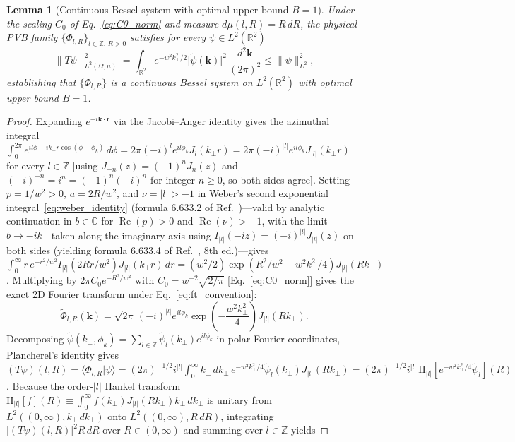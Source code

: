 \documentclass[aps,pra,reprint,nofootinbib,floatfix,longbibliography]{revtex4-2}
\newtheorem{lemma}{Lemma}
\theoremstyle{remark}
\newcommand{\braket}[2]{\langle #1 | #2 \rangle}
\newcommand{\norm}[1]{\lVert #1 \rVert}
\newcommand{\abs}[1]{\lvert #1 \rvert}
\begin{document}
\begin{lemma}[Continuous Bessel system with optimal upper bound $B=1$]
\label{lem:bessel_upper}
Under the scaling $C_0$ of Eq.~\eqref{eq:C0_norm} and measure \mbox{$d\mu(l,R) = R\,dR$}, the physical PVB family $\{\Phi_{l,R}\}_{l\in\mathbb{Z},\,R>0}$ satisfies for every $\psi \in L^2(\mathbb{R}^2)$
\begin{equation}
\norm{T\psi}_{L^2(\Omega,\mu)}^2 = \int_{\mathbb{R}^2} e^{-w^2 k_\perp^2/2}\abs{\widetilde{\psi}(\mathbf{k})}^2\,\frac{d^2\mathbf{k}}{(2\pi)^2} \le \norm{\psi}_{L^2}^2,
\label{eq:bessel_lemma}
\end{equation}
establishing that $\{\Phi_{l,R}\}$ is a continuous Bessel system on $L^2(\mathbb{R}^2)$ with optimal upper bound $B = 1$.
\end{lemma}
\begin{proof}
Expanding $e^{-i\mathbf{k}\cdot\mathbf{r}}$ via the Jacobi--Anger identity gives the azimuthal integral $\int_0^{2\pi} e^{il\phi - ik_\perp r\cos(\phi-\phi_k)}\,d\phi = 2\pi (-i)^l e^{il\phi_k} J_l(k_\perp r) = 2\pi (-i)^{\abs{l}} e^{il\phi_k} J_{\abs{l}}(k_\perp r)$ for every $l \in \mathbb{Z}$ [using $J_{-n}(z) = (-1)^n J_n(z)$ and $(-i)^{-n} = i^n = (-1)^n(-i)^n$ for integer $n \ge 0$, so both sides agree]. Setting $p = 1/w^2 > 0$, $a = 2R/w^2$, and $\nu = \abs{l} > -1$ in Weber's second exponential integral~\eqref{eq:weber_identity} (formula 6.633.2 of Ref.~\cite{Gradshteyn2014})---valid by analytic continuation in $b \in \mathbb{C}$ for $\operatorname{Re}(p) > 0$ and $\operatorname{Re}(\nu) > -1$, with the limit $b \to -i k_\perp$ taken along the imaginary axis using $I_{\abs{l}}(-i z) = (-i)^{\abs{l}} J_{\abs{l}}(z)$ on both sides (yielding formula 6.633.4 of Ref.~\cite{Gradshteyn2014}, 8th ed.)---gives $\int_0^\infty r\,e^{-r^2/w^2} I_{\abs{l}}(2Rr/w^2) J_{\abs{l}}(k_\perp r)\,dr = (w^2/2)\exp(R^2/w^2 - w^2 k_\perp^2/4) J_{\abs{l}}(R k_\perp)$. Multiplying by $2\pi C_0 e^{-R^2/w^2}$ with $C_0 = w^{-2}\sqrt{2/\pi}$ [Eq.~\eqref{eq:C0_norm}] gives the exact 2D Fourier transform under Eq.~\eqref{eq:ft_convention}:
\begin{equation}
\widetilde{\Phi}_{l,R}(\mathbf{k}) = \sqrt{2\pi}\,(-i)^{\abs{l}} e^{il\phi_k} \exp\!\left(-\frac{w^2 k_\perp^2}{4}\right) J_{\abs{l}}(R k_\perp).
\label{eq:pvb_ft}
\end{equation}
Decomposing $\widetilde{\psi}(k_\perp,\phi_k) = \sum_{l\in\mathbb{Z}} \widetilde{\psi}_l(k_\perp)e^{il\phi_k}$ in polar Fourier coordinates, Plancherel's identity gives $(T\psi)(l,R) = \braket{\Phi_{l,R}}{\psi} = (2\pi)^{-1/2} i^{\abs{l}} \allowbreak \int_0^\infty k_\perp\,dk_\perp\, \allowbreak e^{-w^2 k_\perp^2/4}\widetilde{\psi}_l(k_\perp) J_{\abs{l}}(Rk_\perp) = (2\pi)^{-1/2} i^{\abs{l}}\,\mathrm{H}_{\abs{l}}[e^{-w^2 k_\perp^2/4}\widetilde{\psi}_l](R)$. Because the order-$\abs{l}$ Hankel transform $\mathrm{H}_{\abs{l}}[f](R) \equiv \int_0^\infty f(k_\perp) J_{\abs{l}}(R k_\perp) k_\perp\,dk_\perp$ is unitary from $L^2((0,\infty), k_\perp\,dk_\perp)$ onto $L^2((0,\infty), R\,dR)$, integrating $\abs{(T\psi)(l,R)}^2 R\,dR$ over $R \in (0,\infty)$ and summing over $l \in \mathbb{Z}$ yields

\end{proof}
\end{document}
